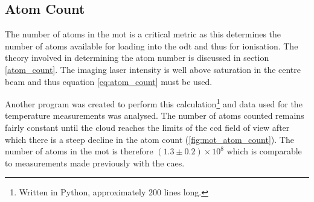 \subsection{Atom Count}
\label{mot_atom_count}
The number of atoms in the \gls{mot} is a critical metric as this determines the number of atoms available for loading into the \gls{odt} and thus for ionisation. The theory involved in determining the atom number is discussed in section \ref{atom_count}. The imaging laser intensity is well above saturation in the centre beam and thus equation \ref{eq:atom_count} must be used.

Another program was created to perform this calculation\footnote{Written in Python, approximately 200 lines long.} and data used for the temperature measurements was analysed. The number of atoms counted remains fairly constant until the cloud reaches the limits of the \gls{ccd} field of view after which there is a steep decline in the atom count (\ref{fig:mot_atom_count}). The number of atoms in the \gls{mot} is therefore $(1.3 \pm0.2)\times10^8$ which is comparable to measurements made previously with the \gls{caes}\cite{sheludko_shaped_2010}.

